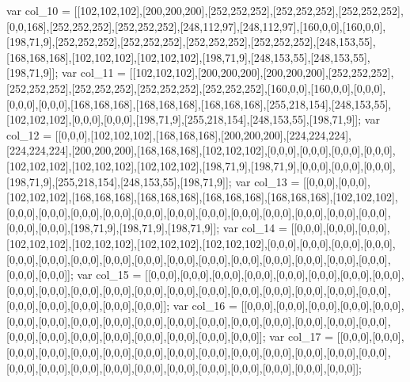 var col_10 = [[102,102,102],[200,200,200],[252,252,252],[252,252,252],[252,252,252],[0,0,168],[252,252,252],[252,252,252],[248,112,97],[248,112,97],[160,0,0],[160,0,0],[198,71,9],[252,252,252],[252,252,252],[252,252,252],[252,252,252],[248,153,55],[168,168,168],[102,102,102],[102,102,102],[198,71,9],[248,153,55],[248,153,55],[198,71,9]];
var col_11 = [[102,102,102],[200,200,200],[200,200,200],[252,252,252],[252,252,252],[252,252,252],[252,252,252],[252,252,252],[160,0,0],[160,0,0],[0,0,0],[0,0,0],[0,0,0],[168,168,168],[168,168,168],[168,168,168],[255,218,154],[248,153,55],[102,102,102],[0,0,0],[0,0,0],[198,71,9],[255,218,154],[248,153,55],[198,71,9]];
var col_12 = [[0,0,0],[102,102,102],[168,168,168],[200,200,200],[224,224,224],[224,224,224],[200,200,200],[168,168,168],[102,102,102],[0,0,0],[0,0,0],[0,0,0],[0,0,0],[102,102,102],[102,102,102],[102,102,102],[198,71,9],[198,71,9],[0,0,0],[0,0,0],[0,0,0],[198,71,9],[255,218,154],[248,153,55],[198,71,9]];
var col_13 = [[0,0,0],[0,0,0],[102,102,102],[168,168,168],[168,168,168],[168,168,168],[168,168,168],[102,102,102],[0,0,0],[0,0,0],[0,0,0],[0,0,0],[0,0,0],[0,0,0],[0,0,0],[0,0,0],[0,0,0],[0,0,0],[0,0,0],[0,0,0],[0,0,0],[0,0,0],[198,71,9],[198,71,9],[198,71,9]];
var col_14 = [[0,0,0],[0,0,0],[0,0,0],[102,102,102],[102,102,102],[102,102,102],[102,102,102],[0,0,0],[0,0,0],[0,0,0],[0,0,0],[0,0,0],[0,0,0],[0,0,0],[0,0,0],[0,0,0],[0,0,0],[0,0,0],[0,0,0],[0,0,0],[0,0,0],[0,0,0],[0,0,0],[0,0,0],[0,0,0]];
var col_15 = [[0,0,0],[0,0,0],[0,0,0],[0,0,0],[0,0,0],[0,0,0],[0,0,0],[0,0,0],[0,0,0],[0,0,0],[0,0,0],[0,0,0],[0,0,0],[0,0,0],[0,0,0],[0,0,0],[0,0,0],[0,0,0],[0,0,0],[0,0,0],[0,0,0],[0,0,0],[0,0,0],[0,0,0],[0,0,0]];
var col_16 = [[0,0,0],[0,0,0],[0,0,0],[0,0,0],[0,0,0],[0,0,0],[0,0,0],[0,0,0],[0,0,0],[0,0,0],[0,0,0],[0,0,0],[0,0,0],[0,0,0],[0,0,0],[0,0,0],[0,0,0],[0,0,0],[0,0,0],[0,0,0],[0,0,0],[0,0,0],[0,0,0],[0,0,0],[0,0,0]];
var col_17 = [[0,0,0],[0,0,0],[0,0,0],[0,0,0],[0,0,0],[0,0,0],[0,0,0],[0,0,0],[0,0,0],[0,0,0],[0,0,0],[0,0,0],[0,0,0],[0,0,0],[0,0,0],[0,0,0],[0,0,0],[0,0,0],[0,0,0],[0,0,0],[0,0,0],[0,0,0],[0,0,0],[0,0,0],[0,0,0]];







